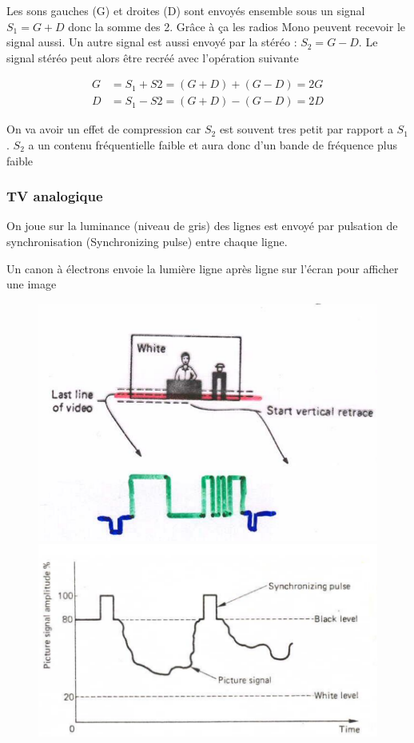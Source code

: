 			Les sons gauches (G) et droites (D) sont envoyés ensemble sous un signal $S_1 = G+D$ donc la somme des 2. Grâce à ça les radios Mono peuvent recevoir le signal aussi. Un autre signal est aussi envoyé par la stéréo : $S_2 = G-D$. Le signal stéréo peut alors être recréé avec l'opération suivante


			\begin{align*} 
				G &=  S_1 + S2 = (G+D) + (G-D) = 2G \\ 		
				D &=  S_1 - S2 = (G+D) - (G-D) = 2D
			\end{align*}
			
			On va avoir un effet de compression car $S_2$ est souvent tres petit par rapport a $S_1$. $S_2$ a un contenu fréquentielle faible et aura donc d'un bande de fréquence plus faible
		
		\subsubsection{TV analogique}
		
			On joue sur la luminance (niveau de gris) des lignes est envoyé par pulsation de synchronisation (Synchronizing pulse) entre chaque ligne.

			Un canon à électrons envoie la lumière ligne après ligne sur l'écran pour afficher une image
			
\begin{figure}[H]
\centering
\begin{minipage}{.5\textwidth}
  \centering
  \includegraphics[width=.5\textwidth]{img/TV1.png}
\end{minipage}%
\begin{minipage}{.5\textwidth}
  \centering
  \includegraphics[width=.5\textwidth]{img/TV2.png}
\end{minipage}
\end{figure}
			
